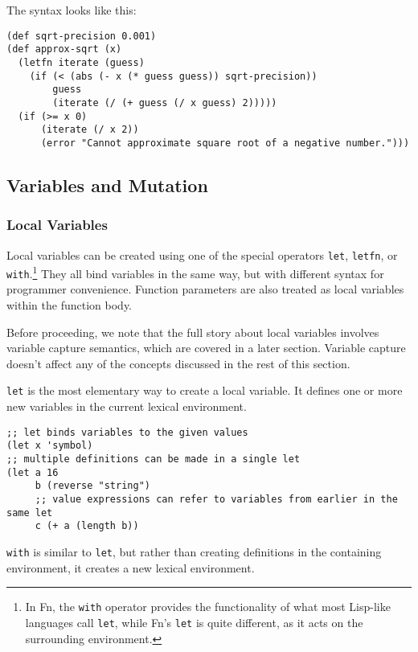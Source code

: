 \documentclass[11pt]{article}
\begin{document}
The syntax looks like this:

\begin{verbatim}
(def sqrt-precision 0.001)
(def approx-sqrt (x)
  (letfn iterate (guess)
    (if (< (abs (- x (* guess guess)) sqrt-precision))
        guess
        (iterate (/ (+ guess (/ x guess) 2)))))
  (if (>= x 0)
      (iterate (/ x 2))
      (error "Cannot approximate square root of a negative number.")))
\end{verbatim}


\subsection{Variables and Mutation}
\label{sec:org761ce8a}

\subsubsection{Local Variables}
\label{sec:org45e7d44}

Local variables can be created using one of the special operators \texttt{let}, \texttt{letfn}, or
\texttt{with}.\footnote{In Fn, the \texttt{with} operator provides the functionality of what
most Lisp-like languages call \texttt{let}, while Fn's \texttt{let} is quite different, as it acts
on the surrounding environment.} They all bind variables in the same way, but with
different syntax for programmer convenience. Function parameters are also
treated as local variables within the function body.

Before proceeding, we note that the full story about local variables involves
variable capture semantics, which are covered in a later section. Variable
capture doesn't affect any of the concepts discussed in the rest of this section.

\texttt{let} is the most elementary way to create a local variable. It defines one or
more new variables in the current lexical environment.

\begin{verbatim}
;; let binds variables to the given values
(let x 'symbol)
;; multiple definitions can be made in a single let
(let a 16
     b (reverse "string")
     ;; value expressions can refer to variables from earlier in the same let
     c (+ a (length b))
\end{verbatim}

\texttt{with} is similar to \texttt{let}, but rather than creating definitions in the containing
environment, it creates a new lexical environment.
\end{document}
